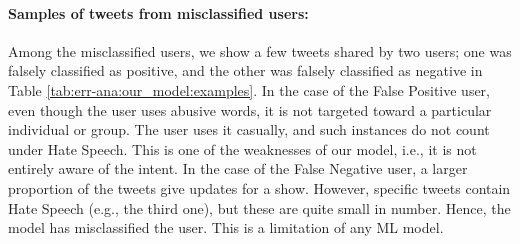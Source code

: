 \paragraph{Samples of tweets from misclassified users:}
Among the misclassified users, we show a few tweets shared by two users; one was falsely classified as positive, and the other was falsely classified as negative in Table \ref{tab:err-ana:our_model:examples}.
In the case of the False Positive user, even though the user uses abusive words, it is not targeted toward a particular individual or group. The user uses it casually, and such instances do not count under Hate Speech. This is one of the weaknesses of our model, i.e., it is not entirely aware of the intent.
In the case of the False Negative user, a larger proportion of the tweets give updates for a show. However, specific tweets contain Hate Speech (e.g., the third one), but these are quite small in number. Hence, the model has misclassified the user. This is a limitation of any ML model.





